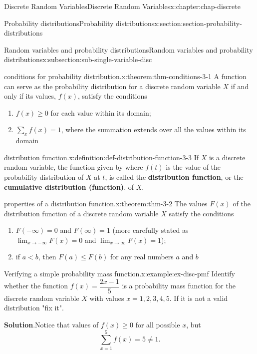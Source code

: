 \documentclass[oneside,10pt,]{book}
\newcommand{\blocktitlefont}{\relax}
\newcommand{\terminology}[1]{\textbf{#1}}
\newcommand{\lt}{<}
\begin{document}
\begin{chapterptx}{Discrete Random Variables}{}{Discrete Random Variables}{}{}{x:chapter:chap-discrete}
\begin{sectionptx}{Probability distributions}{}{Probability distributions}{}{}{x:section:section-probability-distributions}
\begin{subsectionptx}{Random variables and probability distributions}{}{Random variables and probability distributions}{}{}{x:subsection:sub-single-variable-disc}
\begin{theorem}{conditions for probability distribution.}{}{x:theorem:thm-conditions-3-1}
A function can serve as the probability distribution for a discrete random variable \(\displaystyle X\) if and only if its values, \(\displaystyle f(x)\), satisfy the conditions%
\begin{enumerate}
\item{}\(\displaystyle f(x) \ge 0\) for each value within its domain;%
\item{}\(\displaystyle \sum_x f(x) = 1\), where the summation extends over all the values within its domain%
\end{enumerate}
%
\end{theorem}
\begin{definition}{distribution function.}{x:definition:def-distribution-function-3-3}%
If \(\displaystyle X\) is a discrete random variable, the function given by  where \(\displaystyle f(t)\) is the value of the probability distribution of \(\displaystyle X\) at \(\displaystyle t\), is called the \terminology{distribution function}, or the \terminology{cumulative distribution (function)}, of \(\displaystyle X\).%
\end{definition}
\begin{theorem}{properties of a distribution function.}{}{x:theorem:thm-3-2}%
The values \(\displaystyle F(x)\) of the distribution function of a discrete random variable \(\displaystyle X\) satisfy the conditions%
\begin{enumerate}
\item{}\(\displaystyle F(-\infty) = 0\) and \(\displaystyle F(\infty)
= 1\) (more carefully stated as \(\displaystyle
\lim_{x\to-\infty}F(x) = 0\) and \(\displaystyle \lim_{x\to\infty}
F(x) = 1\));%
\item{}if \(\displaystyle a \lt b\), then \(\displaystyle F(a) \le
F(b)\) for any real numbers \(\displaystyle a\) and \(\displaystyle b\)%
\end{enumerate}
%
\end{theorem}
\begin{example}{Verifying a simple probability mass function.}{x:example:ex-disc-pmf}%
Identify whether the function \(f(x) = \dfrac{2x-1}{5}\) is a probability mass function for the discrete random variable \(X\) with values \(x=1,2,3,4,5\).  If it is not a valid distribution "fix it".%
\par\smallskip%
\noindent\textbf{\blocktitlefont Solution}.\hypertarget{g:solution:idp140500431874848}{}\quad{}Notice that values of \(f(x) \ge 0\) for all possible \(x\), but%
\begin{equation*}
\sum\limits_{x=1}^5 f(x) = 5 \neq 1.

\end{equation*}
\end{example}
\end{subsectionptx}
\end{sectionptx}
\end{chapterptx}
\end{document}
